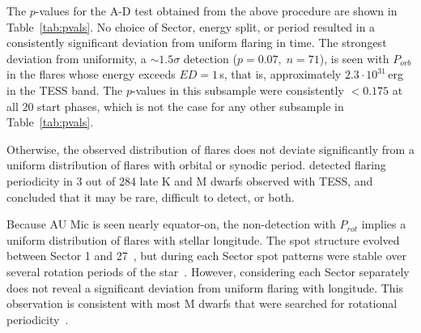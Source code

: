 \documentclass[fleqn,usenatbib]{mnras}%
\begin{document}
The $p$-values for the A-D test obtained from the above procedure are shown in Table~\ref{tab:pvals}. No choice of Sector, energy split, or period resulted in a consistently significant deviation from uniform flaring in time. The strongest deviation from uniformity, a $\sim1.5\sigma$ detection ($p=0.07,\;n=71$), is seen with $P_{orb}$ in the flares whose energy exceeds $ED=1$\,s, that is, approximately $2.3\cdot10^{31}\,$erg in the TESS band. The $p$-values in this subsample were consistently $<0.175$ at all 20 start phases, which is not the case for any other subsample in Table~\ref{tab:pvals}.

Otherwise, the observed distribution of flares does not deviate significantly from a uniform distribution of flares with orbital or synodic period. \citet{howard2021evryflare} detected flaring periodicity in 3 out of 284 late K and M dwarfs observed with TESS, and concluded that it may be rare, difficult to detect, or both.

Because AU Mic is seen nearly equator-on, the non-detection with $P_{rot}$ implies a uniform distribution of flares with stellar longitude. The spot structure evolved between Sector 1 and 27~\citep{martioli2021new}, but during each Sector spot patterns were stable over several rotation periods of the star~\citep{szabo2021changing}. However, considering each Sector separately does not reveal a significant deviation from uniform flaring with longitude. This observation is consistent with most M dwarfs that were searched for rotational periodicity~\citep{doyle2018, doyle2019}.

 

\end{document}
